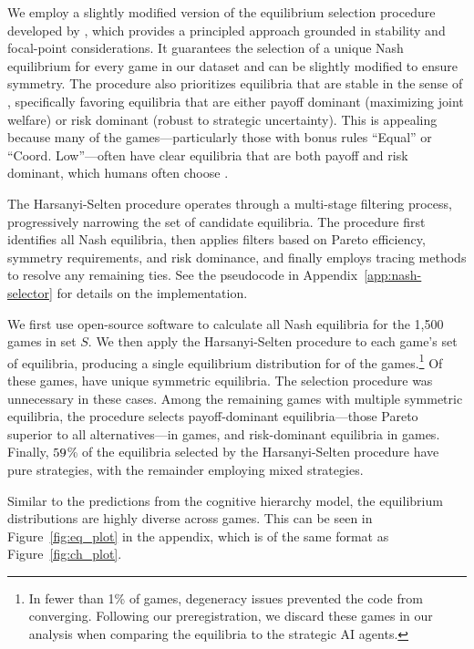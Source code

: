 \documentclass[11pt]{article}
\theoremstyle{definition}
\newcommand{\aisub}{AI agent}
\newcommand{\NGamesS}{1,500}
\begin{document}
We employ a slightly modified version of the equilibrium selection procedure developed by \citet{HarsanyiSelten1988}, which provides a principled approach grounded in stability and focal-point considerations. 
It guarantees the selection of a unique Nash equilibrium for every game in our dataset and can be slightly modified to ensure symmetry. 
The procedure also prioritizes equilibria that are stable in the sense of \citet{schelling1960strategy}, specifically favoring equilibria that are either payoff dominant (maximizing joint welfare) or risk dominant (robust to strategic uncertainty). 
This is appealing because many of the games---particularly those with bonus rules ``Equal'' or ``Coord. Low''---often have clear equilibria that are both payoff and risk dominant, which humans often choose \citep{camerer2003behavioral}. 

The Harsanyi-Selten procedure operates through a multi-stage filtering process, progressively narrowing the set of candidate equilibria. 
The procedure first identifies all Nash equilibria, then applies filters based on Pareto efficiency, symmetry requirements, and risk dominance, and finally employs tracing methods to resolve any remaining ties. 
See the pseudocode in Appendix~\ref{app:nash-selector} for details on the implementation.

We first use open-source software \citep{gambit2025} to calculate all Nash equilibria for the \NGamesS{} games in set $S$. 
We then apply the Harsanyi-Selten procedure to each game's set of equilibria, producing a single equilibrium distribution for \GamesConverged{} of the games.\footnote{
In fewer than 1\% of games, degeneracy issues prevented the code from converging.
Following our preregistration, we discard these games in our analysis when comparing the equilibria to the strategic \aisub{s}.}
Of these \GamesConverged{} games, \CountUniqueEq{} have unique symmetric equilibria.
The selection procedure was unnecessary in these cases. 
Among the remaining games with multiple symmetric equilibria, the procedure selects payoff-dominant equilibria---those Pareto superior to all alternatives---in \CountPayoffDomEq{} games, and risk-dominant equilibria in \CountRiskDomEq{} games. 
Finally, $59$\% of the equilibria selected by the Harsanyi-Selten procedure have pure strategies, with the remainder employing mixed strategies.

Similar to the predictions from the cognitive hierarchy model, the equilibrium distributions are highly diverse across games.
This can be seen in Figure~\ref{fig:eq_plot} in the appendix, which is of the same format as Figure~\ref{fig:ch_plot}.
\end{document}
